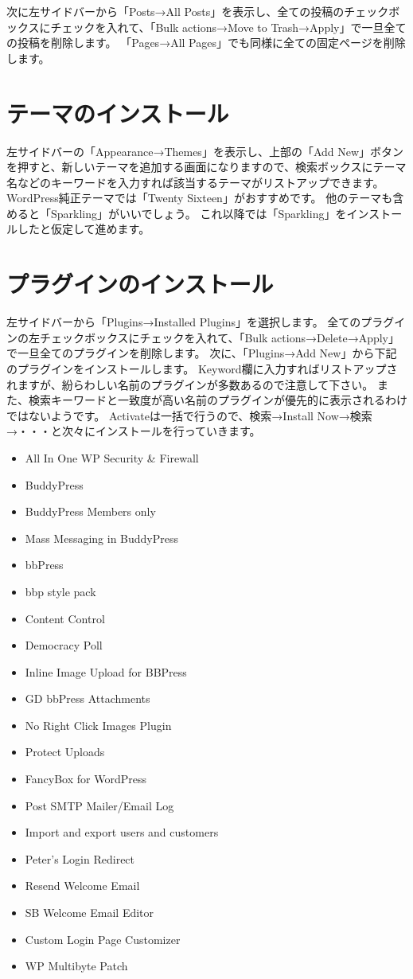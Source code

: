 \documentclass[titlepage,10pt,a4paper,uplatex]{jsbook}
\begin{document}
次に左サイドバーから「Posts→All Posts」を表示し、全ての投稿のチェックボックスにチェックを入れて、「Bulk actions→Move to Trash→Apply」で一旦全ての投稿を削除します。
「Pages→All Pages」でも同様に全ての固定ページを削除します。

\section{テーマのインストール}

左サイドバーの「Appearance→Themes」を表示し、上部の「Add New」ボタンを押すと、新しいテーマを追加する画面になりますので、検索ボックスにテーマ名などのキーワードを入力すれば該当するテーマがリストアップできます。
WordPress純正テーマでは「Twenty Sixteen」がおすすめです。
他のテーマも含めると「Sparkling」がいいでしょう。
これ以降では「Sparkling」をインストールしたと仮定して進めます。

\section{プラグインのインストール}

左サイドバーから「Plugins→Installed Plugins」を選択します。
全てのプラグインの左チェックボックスにチェックを入れて、「Bulk actions→Delete→Apply」で一旦全てのプラグインを削除します。
次に、「Plugins→Add New」から下記のプラグインをインストールします。
Keyword欄に入力すればリストアップされますが、紛らわしい名前のプラグインが多数あるので注意して下さい。
また、検索キーワードと一致度が高い名前のプラグインが優先的に表示されるわけではないようです。
Activateは一括で行うので、検索→Install Now→検索→・・・と次々にインストールを行っていきます。

\begin{itemize}
\item All In One WP Security \& Firewall
\item BuddyPress
\item BuddyPress Members only
\item Mass Messaging in BuddyPress
\item bbPress
\item bbp style pack
\item Content Control
\item Democracy Poll
\item Inline Image Upload for BBPress
\item GD bbPress Attachments
\item No Right Click Images Plugin
\item Protect Uploads
\item FancyBox for WordPress
\item Post SMTP Mailer/Email Log
\item Import and export users and customers
\item Peter's Login Redirect
\item Resend Welcome Email
\item SB Welcome Email Editor
\item Custom Login Page Customizer
\item WP Multibyte Patch
\end{itemize}
\end{document}
